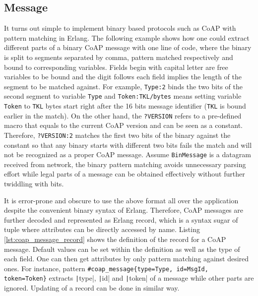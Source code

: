 \subsection{Message}

It turns out simple to implement binary based protocols such as CoAP with pattern matching in Erlang. The following example shows how one could extract different parts of a binary CoAP message with one line of code, where the binary is split to segments separated by comma, pattern matched respectively and bound to corresponding variables. Fields begin with capital letter are free variables to be bound and the digit follows each field implies the length of the segment to be matched against. For example, \verb|Type:2| binds the two bits of the second segment to variable \verb|Type| and \verb|Token:TKL/bytes| means setting variable \verb|Token| to \verb|TKL| bytes start right after the 16 bits message identifier (\verb|TKL| is bound earlier in the match). On the other hand, the \verb|?VERSION| refers to a pre-defined macro that equals to the current CoAP version and can be seen as a constant. Therefore, \verb|?VERSION:2| matches the first two bits of the binary against the constant so that any binary starts with different two bits fails the match and will not be recognized as a proper CoAP message. Assume \verb|BinMessage| is a datagram received from network, the binary pattern matching avoids unnecessary parsing effort while legal parts of a message can be obtained effectively without further twiddling with bits. 


It is error-prone and obscure to use the above format all over the application despite the convenient binary syntax of Erlang. Therefore, CoAP messages are further decoded and represented as Erlang record, which is a syntax sugar of tuple where attributes can be directly accessed by name. Listing \ref{lst:coap_message_record} shows the definition of the record for a CoAP message. Default values can be set within the definition as well as the type of each field. One can then get attributes by only pattern matching against desired ones. For instance, pattern \verb|#coap_message{type=Type, id=MsgId, token=Token}| extracts \texttt|type|, \texttt|id| and \texttt|token| of a message while other parts are ignored. Updating of a record can be done in similar way. 

